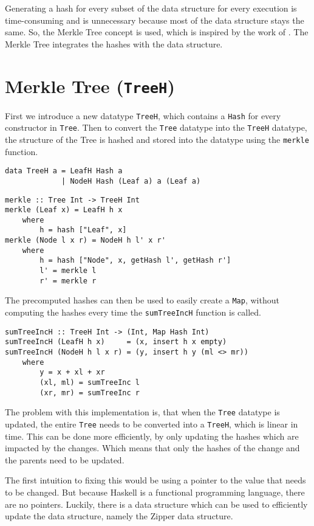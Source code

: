 Generating a hash for every subset of the data structure for every execution is time-consuming and is unnecessary because most of the data structure stays the same. So, the Merkle Tree concept is used, which is inspired by the work of \citeauthor{miraldo2019efficient}\cite{miraldo2019efficient}. The Merkle Tree integrates the hashes with the data structure.

\section{Merkle Tree (\texttt{TreeH})}
First we introduce a new datatype \texttt{TreeH}, which contains a \texttt{Hash} for every constructor in \texttt{Tree}. Then to convert the \texttt{Tree} datatype into the \texttt{TreeH} datatype, the structure of the Tree is hashed and stored into the datatype using the \texttt{merkle} function.

\begin{verbatim}
data TreeH a = LeafH Hash a
             | NodeH Hash (Leaf a) a (Leaf a)
\end{verbatim}

\begin{verbatim}
merkle :: Tree Int -> TreeH Int
merkle (Leaf x) = LeafH h x
    where
        h = hash ["Leaf", x]
merkle (Node l x r) = NodeH h l' x r'
    where
        h = hash ["Node", x, getHash l', getHash r']
        l' = merkle l
        r' = merkle r
\end{verbatim}

The precomputed hashes can then be used to easily create a \texttt{Map}, without computing the hashes every time the \texttt{sumTreeIncH} function is called.

\begin{verbatim}
sumTreeIncH :: TreeH Int -> (Int, Map Hash Int)
sumTreeIncH (LeafH h x)     = (x, insert h x empty)
sumTreeIncH (NodeH h l x r) = (y, insert h y (ml <> mr))
    where
        y = x + xl + xr
        (xl, ml) = sumTreeInc l
        (xr, mr) = sumTreeInc r
\end{verbatim}

The problem with this implementation is, that when the \texttt{Tree} datatype is updated, the entire \texttt{Tree} needs to be converted into a \texttt{TreeH}, which is linear in time. This can be done more efficiently, by only updating the hashes which are impacted by the changes. Which means that only the hashes of the change and the parents need to be updated. 

The first intuition to fixing this would be using a pointer to the value that needs to be changed. But because Haskell is a functional programming language, there are no pointers. Luckily, there is a data structure which can be used to efficiently update the data structure, namely the Zipper\cite{huet1997zipper} data structure.

